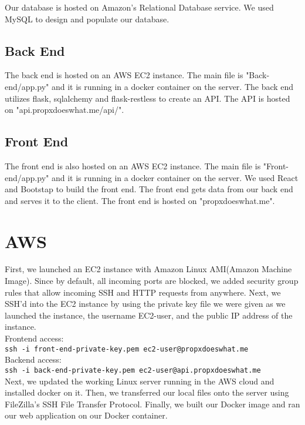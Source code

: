 \documentclass[12pt]{article}
\newcommand{\code}[1]{\texttt{#1}}
\begin{document}
Our database is hosted on Amazon's Relational Database service. We used MySQL to design and populate our database.

\subsection{Back End}

The back end is hosted on an AWS EC2 instance. The main file is "Back-end/app.py" and it is running in a docker container on the server. The back end utilizes flask, sqlalchemy and flask-restless to create an API. The API is hosted on "api.propxdoeswhat.me/api/".

\subsection{Front End}

The front end is also hosted on an AWS EC2 instance. The main file is "Front-end/app.py" and it is running in a docker container on the server. We used React and Bootstap to build the front end. The front end gets data from our back end and serves it to the client. The front end is hosted on "propxdoeswhat.me".

\section{AWS}

First, we launched an EC2 instance with Amazon Linux AMI(Amazon Machine Image). Since by default, all incoming ports are blocked, we added security group rules that allow incoming SSH and HTTP requests from anywhere. Next, we SSH'd into the EC2 instance by using the private key file we were given as we launched the instance, the username EC2-user, and the public IP address of the instance. \\

Frontend access: \\
\code{ssh -i front-end-private-key.pem ec2-user@propxdoeswhat.me} \\
Backend access: \\
\code{ssh -i back-end-private-key.pem ec2-user@api.propxdoeswhat.me} \\

Next, we updated the working Linux server running in the AWS cloud and installed docker on it. Then, we transferred our local files onto the server using FileZilla's SSH File Transfer Protocol. Finally, we built our Docker image and ran our web application on our Docker container.
\end{document}
